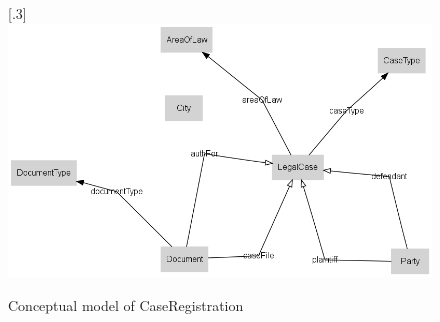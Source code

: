 \documentclass[10pt,a4paper]{report}              %
\theoremstyle{plain}\theorembodyfont{\rmfamily}\newtheorem{definition}{Definition}[section]
\theoremstyle{plain}\theorembodyfont{\rmfamily}\newtheorem{designrule}[definition]{Requirement}
\begin{document}
\begin{figure}[htb]
\begin{center}
\scalebox{.3}[.3]{\includegraphics{PatCaseRegistration}}
\caption{Conceptual model of CaseRegistration}
\label{fig:PatCaseRegistration}
\end{center}
\end{figure}
\end{document}
